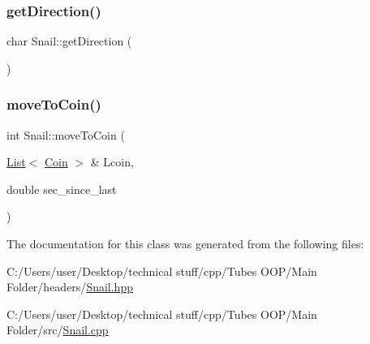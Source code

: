 \mbox{\label{class_snail_a5b4774b31b0eb0253910680d4e49f403}} 
\subsubsection{\texorpdfstring{get\+Direction()}{getDirection()}}
{\footnotesize\ttfamily char Snail\+::get\+Direction (\begin{DoxyParamCaption}{ }\end{DoxyParamCaption})}

\mbox{\label{class_snail_ac02f07964ad0a0db28204acc7ed294b7}} 
\subsubsection{\texorpdfstring{move\+To\+Coin()}{moveToCoin()}}
{\footnotesize\ttfamily int Snail\+::move\+To\+Coin (\begin{DoxyParamCaption}\item[{\mbox{\hyperlink{class_list}{List}}$<$ \mbox{\hyperlink{class_coin}{Coin}} $>$ \&}]{Lcoin,  }\item[{double}]{sec\+\_\+since\+\_\+last }\end{DoxyParamCaption})}



The documentation for this class was generated from the following files\+:\begin{DoxyCompactItemize}
\item 
C\+:/\+Users/user/\+Desktop/technical stuff/cpp/\+Tubes O\+O\+P/\+Main Folder/headers/\mbox{\hyperlink{_snail_8hpp}{Snail.\+hpp}}\item 
C\+:/\+Users/user/\+Desktop/technical stuff/cpp/\+Tubes O\+O\+P/\+Main Folder/src/\mbox{\hyperlink{_snail_8cpp}{Snail.\+cpp}}\end{DoxyCompactItemize}
